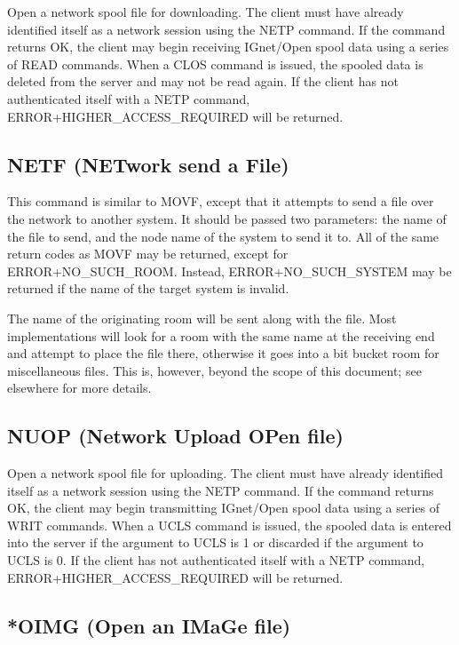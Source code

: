  Open a network spool file for downloading.  The client must have already
identified itself as a network session using the NETP command.  If the command
returns OK, the client may begin receiving IGnet/Open spool data using
a series of READ commands.  When a CLOS command is issued, the spooled data
is deleted from the server and may not be read again.  If the client has not
authenticated itself with a NETP command, ERROR+HIGHER_ACCESS_REQUIRED will
be returned.



\subsection{NETF (NETwork send a File)}

 This command is similar to MOVF, except that it attempts to send a file over
the network to another system.  It should be passed two parameters: the name
of the file to send, and the node name of the system to send it to.  All of
the same return codes as MOVF may be returned, except for ERROR+NO_SUCH_ROOM.
Instead, ERROR+NO_SUCH_SYSTEM may be returned if the name of the target
system is invalid.

 The name of the originating room will be sent along with the file.  Most
implementations will look for a room with the same name at the receiving end
and attempt to place the file there, otherwise it goes into a bit bucket room
for miscellaneous files.  This is, however, beyond the scope of this document;
see elsewhere for more details.



\subsection{NUOP (Network Upload OPen file)}

 Open a network spool file for uploading.  The client must have already
identified itself as a network session using the NETP command.  If the command
returns OK, the client may begin transmitting IGnet/Open spool data using
a series of WRIT commands.  When a UCLS command is issued, the spooled data
is entered into the server if the argument to UCLS is 1 or discarded if the
argument to UCLS is 0.  If the client has not authenticated itself with a
NETP command, ERROR+HIGHER_ACCESS_REQUIRED will be returned.



\subsection{*OIMG (Open an IMaGe file)}

